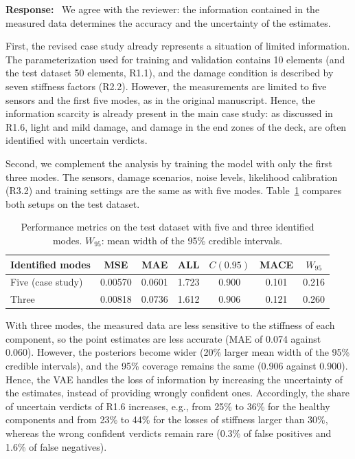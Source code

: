 \documentclass[11pt]{article}
\newenvironment{response}{\par\smallskip\noindent\color{resp}\textbf{Response:}\ }{\par}
\begin{document}
\begin{response}
We agree with the reviewer: the information contained in the measured data determines the accuracy and the uncertainty of the estimates.

First, the revised case study already represents a situation of limited information.
The parameterization used for training and validation contains 10 elements (and the test dataset 50 elements, R1.1), and the damage condition is described by seven stiffness factors (R2.2).
However, the measurements are limited to five sensors and the first five modes, as in the original manuscript.
Hence, the information scarcity is already present in the main case study: as discussed in R1.6, light and mild damage, and damage in the end zones of the deck, are often identified with uncertain verdicts.

Second, we complement the analysis by training the model with only the first three modes.
The sensors, damage scenarios, noise levels, likelihood calibration (R3.2) and training settings are the same as with five modes.
Table~\ref{tab:modes} compares both setups on the test dataset.
\begin{table}[H]
	\centering\small
	\caption{Performance metrics on the test dataset with five and three identified modes. $W_{95}$: mean width of the 95\% credible intervals.}
	\label{tab:modes}
	\begin{tabular}{lcccccc}
		\toprule
		Identified modes & MSE & MAE & ALL & $C(0.95)$ & MACE & $W_{95}$ \\
		\midrule
		Five (case study) & 0.00570 & 0.0601 & 1.723 & 0.900 & 0.101 & 0.216 \\
		Three & 0.00818 & 0.0736 & 1.612 & 0.906 & 0.121 & 0.260 \\
		\bottomrule
	\end{tabular}
\end{table}
With three modes, the measured data are less sensitive to the stiffness of each component, so the point estimates are less accurate (MAE of 0.074 against 0.060).
However, the posteriors become wider (20\% larger mean width of the 95\% credible intervals), and the 95\% coverage remains the same (0.906 against 0.900).
Hence, the VAE handles the loss of information by increasing the uncertainty of the estimates, instead of providing wrongly confident ones.
Accordingly, the share of uncertain verdicts of R1.6 increases, e.g., from 25\% to 36\% for the healthy components and from 23\% to 44\% for the losses of stiffness larger than 30\%, whereas the wrong confident verdicts remain rare (0.3\% of false positives and 1.6\% of false negatives).


\end{response}
\end{document}

